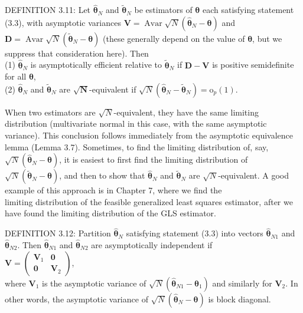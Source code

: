 \documentclass[10pt]{article}
\begin{document}
DEFINITION 3.11: Let $\hat{\boldsymbol{\theta}}_{N}$ and $\tilde{\boldsymbol{\theta}}_{N}$ be estimators of $\boldsymbol{\theta}$ each satisfying statement (3.3), with asymptotic variances $\mathbf{V}=\operatorname{Avar} \sqrt{N}\left(\hat{\boldsymbol{\theta}}_{N}-\boldsymbol{\theta}\right)$ and $\mathbf{D}=\operatorname{Avar} \sqrt{N}\left(\tilde{\boldsymbol{\theta}}_{N}-\boldsymbol{\theta}\right)$ (these generally depend on the value of $\boldsymbol{\theta}$, but we suppress that consideration here). Then\\
(1) $\hat{\boldsymbol{\theta}}_{N}$ is asymptotically efficient relative to $\tilde{\boldsymbol{\theta}}_{N}$ if $\mathbf{D}-\mathbf{V}$ is positive semidefinite for all $\boldsymbol{\theta}$,\\
(2) $\hat{\boldsymbol{\theta}}_{N}$ and $\tilde{\boldsymbol{\theta}}_{N}$ are $\sqrt{\mathbf{N}}$-equivalent if $\sqrt{N}\left(\hat{\boldsymbol{\theta}}_{N}-\tilde{\boldsymbol{\theta}}_{N}\right)=\mathrm{o}_{p}(1)$.

When two estimators are $\sqrt{N}$-equivalent, they have the same limiting distribution (multivariate normal in this case, with the same asymptotic variance). This conclusion follows immediately from the asymptotic equivalence lemma (Lemma 3.7). Sometimes, to find the limiting distribution of, say, $\sqrt{N}\left(\hat{\boldsymbol{\theta}}_{N}-\boldsymbol{\theta}\right)$, it is easiest to first find the limiting distribution of $\sqrt{N}\left(\tilde{\boldsymbol{\theta}}_{N}-\boldsymbol{\theta}\right)$, and then to show that $\hat{\boldsymbol{\theta}}_{N}$ and $\tilde{\boldsymbol{\theta}}_{N}$ are $\sqrt{N}$-equivalent. A good example of this approach is in Chapter 7, where we find the\\
limiting distribution of the feasible generalized least squares estimator, after we have found the limiting distribution of the GLS estimator.

DEFINITION 3.12: Partition $\hat{\boldsymbol{\theta}}_{N}$ satisfying statement (3.3) into vectors $\hat{\boldsymbol{\theta}}_{N 1}$ and $\hat{\boldsymbol{\theta}}_{N 2}$. Then $\hat{\boldsymbol{\theta}}_{N 1}$ and $\hat{\boldsymbol{\theta}}_{N 2}$ are asymptotically independent if\\
$\mathbf{V}=\left(\begin{array}{cc}\mathbf{V}_{1} & \mathbf{0} \\ \mathbf{0} & \mathbf{V}_{2}\end{array}\right)$,\\
where $\mathbf{V}_{1}$ is the asymptotic variance of $\sqrt{N}\left(\hat{\boldsymbol{\theta}}_{N 1}-\boldsymbol{\theta}_{1}\right)$ and similarly for $\mathbf{V}_{2}$. In other words, the asymptotic variance of $\sqrt{N}\left(\hat{\boldsymbol{\theta}}_{N}-\boldsymbol{\theta}\right)$ is block diagonal.
\end{document}

